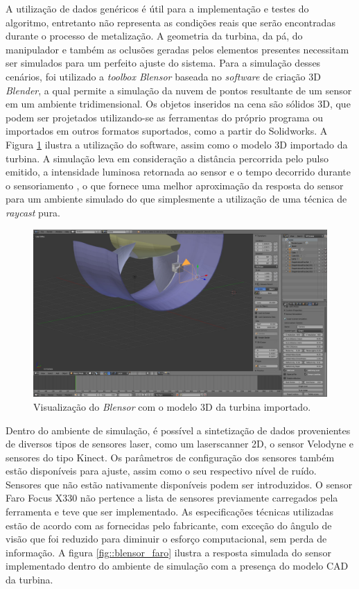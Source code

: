 A utilização de dados genéricos é útil para a implementação e testes do
algoritmo, entretanto não representa as condições reais que serão encontradas
durante o processo de metalização. A geometria da turbina, da pá, do manipulador
e também as oclusões geradas pelos elementos presentes necessitam ser simulados
para um perfeito ajuste do sistema. Para a simulação desses cenários, foi
utilizado a \textit{toolbox Blensor}\footnotemark
{} baseada no \textit{software} de criação 3D
\textit{Blender}\footnotemark,  a qual
permite a simulação da nuvem de pontos resultante de um sensor em um ambiente
tridimensional. Os objetos inseridos na cena são sólidos 3D, que podem ser
projetados utilizando-se as ferramentas do próprio programa ou importados em outros formatos suportados, como a partir do
Solidworks\textregistered. A Figura \ref{fig::blensor_screen}
ilustra a utilização do software, assim como o modelo 3D importado da turbina.
A simulação leva em consideração a distância percorrida pelo pulso emitido, a
intensidade luminosa retornada ao sensor e o tempo decorrido durante o
sensoriamento \cite{Gschwandtner2011}, o que fornece uma melhor aproximação da
resposta do sensor para um ambiente simulado do que simplesmente a utilização de
uma técnica de \textit{raycast} pura.

\begin{figure}[h!]
	\centering
	\includegraphics[width=0.9\columnwidth]{method/figs/calibracao/blensor_screen}
	\caption{Visualização do \textit{Blensor} com o modelo 3D da turbina
	importado.}
    \label{fig::blensor_screen}
\end{figure}

Dentro do ambiente de simulação, é possível a sintetização de dados provenientes
de diversos tipos de sensores laser, como um laserscanner 2D, o sensor
Velodyne e sensores do tipo Kinect. Os parâmetros de configuração
dos sensores também estão disponíveis para ajuste, assim como o seu respectivo
nível de ruído.
Sensores que não estão nativamente disponíveis podem ser introduzidos. O sensor Faro Focus X330 não
pertence a lista de sensores previamente carregados pela ferramenta e teve que
ser implementado. As especificações técnicas utilizadas estão de acordo com as
fornecidas pelo fabricante, com exceção do ângulo de visão que foi reduzido para
diminuir o esforço computacional, sem perda de informação. A figura
\ref{fig::blensor_faro} ilustra a resposta simulada do sensor implementado
dentro do ambiente de simulação com a presença do modelo CAD da turbina.



